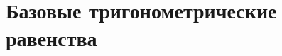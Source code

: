 \documentclass[a4paper,twoside, 11pt]{article}
\begin{document}
\section*{Базовые тригонометрические равенства}














\end{document}
